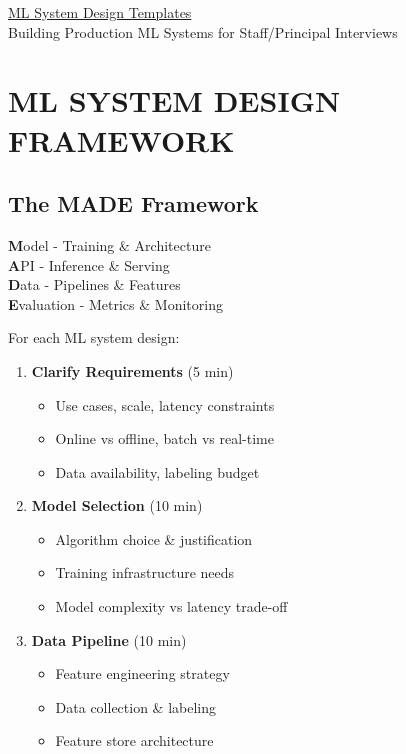 \documentclass[8pt,landscape]{article}
\begin{document}
\raggedright
\scriptsize
\begin{multicols}{3}

\setlength{\premulticols}{1pt}
\setlength{\postmulticols}{1pt}
\setlength{\multicolsep}{1pt}
\setlength{\columnsep}{2pt}

\begin{center}
     \Large{\underline{ML System Design Templates}} \\
     \small{Building Production ML Systems for Staff/Principal Interviews}
\end{center}

\section*{ML SYSTEM DESIGN FRAMEWORK}

\subsection*{The MADE Framework}

\textbf{M}odel - Training \& Architecture \\
\textbf{A}PI - Inference \& Serving \\
\textbf{D}ata - Pipelines \& Features \\
\textbf{E}valuation - Metrics \& Monitoring

For each ML system design:
\begin{enumerate}
\item \textbf{Clarify Requirements} (5 min)
\begin{itemize}
\item Use cases, scale, latency constraints
\item Online vs offline, batch vs real-time
\item Data availability, labeling budget
\end{itemize}

\item \textbf{Model Selection} (10 min)
\begin{itemize}
\item Algorithm choice \& justification
\item Training infrastructure needs
\item Model complexity vs latency trade-off
\end{itemize}

\item \textbf{Data Pipeline} (10 min)
\begin{itemize}
\item Feature engineering strategy
\item Data collection \& labeling
\item Feature store architecture
\end{itemize}


\end{enumerate}
\end{multicols}
\end{document}
